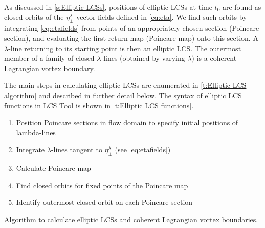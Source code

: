 \documentclass{article}
\begin{document}
As discussed in \cref{s:Elliptic LCSs}, positions of elliptic LCSs at time $t_0$ are found as closed orbits of the $\eta_\pm^\lambda$ vector fields defined in \cref{eq:eta}. We find such orbits by integrating \cref{eq:etafields} from points of an appropriately chosen section (Poincare section), and evaluating the first return map (Poincare map) onto this section. A $\lambda$-line returning to its starting point is then an elliptic LCS. The outermost member of a family of closed $\lambda$-lines (obtained by varying $\lambda$) is a coherent Lagrangian vortex boundary\parencite{haller13:_coher_lagran,haller14:_adden_coher_lagran}.

The main steps in calculating elliptic LCSs are enumerated in \cref{t:Elliptic LCS algorithm} and described in further detail below. The syntax of elliptic LCS functions in LCS Tool is shown in \cref{t:Elliptic LCS functions}.

\begin{table}
\begin{center}
\begin{enumerate}
\item Position Poincare sections in flow domain to specify initial positions of lambda-lines
\item Integrate $\lambda$-lines tangent to $\eta_\pm^\lambda$ (see \cref{eq:etafields})
\item Calculate Poincare map
\item Find closed orbits for fixed points of the Poincare map
\item Identify outermost closed orbit on each Poincare section
\end{enumerate}
\end{center}
\caption{Algorithm to calculate elliptic LCSs and coherent Lagrangian vortex boundaries.}
\label{t:Elliptic LCS algorithm}
\end{table}
\end{document}
